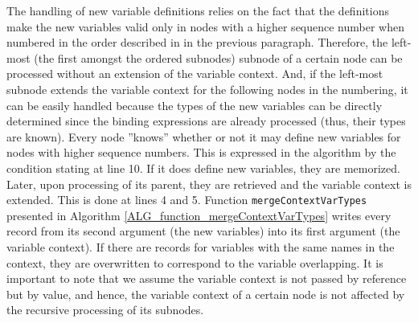 The handling of new variable definitions relies on the fact that the definitions make the new variables valid only in nodes with a higher sequence number when numbered in the order described in in the previous paragraph. Therefore, the left-most (the first amongst the ordered subnodes) subnode of a certain node can be processed without an extension of the variable context. And, if the left-most subnode extends the variable context for the following nodes in the numbering, it can be easily handled because the types of the new variables can be directly determined since the binding expressions are already processed (thus, their types are known). Every node ''knows'' whether or not it may define new variables for nodes with higher sequence numbers. This is expressed in the algorithm by the condition stating at line 10. If it does define new variables, they are memorized. Later, upon processing of its parent, they are retrieved and the variable context is extended. This is done at lines 4 and 5. Function \texttt{mergeContextVarTypes} presented in Algorithm \ref{ALG_function_mergeContextVarTypes} writes every record from its second argument (the new variables) into its first argument (the variable context). If there are records for variables with the same names in the context, they are overwritten to correspond to the variable overlapping. It is important to note that we assume the variable context is not passed by reference but by value, and hence, the variable context of a certain node is not affected by the recursive processing of its subnodes.

